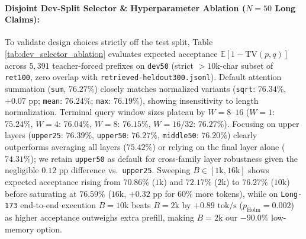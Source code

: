 \documentclass[11pt]{article}
\begin{document}
\paragraph{Disjoint Dev-Split Selector \& Hyperparameter Ablation ($N=50$ Long Claims):}
To validate design choices strictly off the test split, Table \ref{tab:dev_selector_ablation} evaluates expected acceptance $\mathbb{E}[1-\text{TV}(p,q)]$ across $5,391$ teacher-forced prefixes on \texttt{dev50} (strict $>10\text{k}$-char subset of \texttt{ret100}, zero overlap with \texttt{retrieved-heldout300.jsonl}). Default attention summation (\texttt{sum}, $76.27\%$) closely matches normalized variants (\texttt{sqrt}: $76.34\%$, $+0.07\text{ pp}$; \texttt{mean}: $76.24\%$; \texttt{max}: $76.19\%$), showing insensitivity to length normalization. Terminal query window sizes plateau by $W=8\text{--}16$ ($W=1$: $75.24\%$, $W=4$: $76.04\%$, $W=8$: $76.15\%$, $W=16/32$: $76.27\%$). Focusing on upper layers (\texttt{upper25}: $76.39\%$, \texttt{upper50}: $76.27\%$, \texttt{middle50}: $76.20\%$) clearly outperforms averaging all layers ($75.42\%$) or relying on the final layer alone ($74.31\%$); we retain \texttt{upper50} as default for cross-family layer robustness given the negligible $0.12\text{ pp}$ difference vs.\ \texttt{upper25}. Sweeping $B \in [1\text{k}, 16\text{k}]$ shows expected acceptance rising from $70.86\%$ ($1\text{k}$) and $72.17\%$ ($2\text{k}$) to $76.27\%$ ($10\text{k}$) before saturating at $76.59\%$ ($16\text{k}$, $+0.32\text{ pp}$ for $60\%$ more tokens), while on \texttt{Long-173} end-to-end execution $B=10\text{k}$ beats $B=2\text{k}$ by $+0.89\text{ tok/s}$ ($p_{\text{Holm}}=0.002$) as higher acceptance outweighs extra prefill, making $B=2\text{k}$ our $-90.0\%$ low-memory option.
\end{document}
